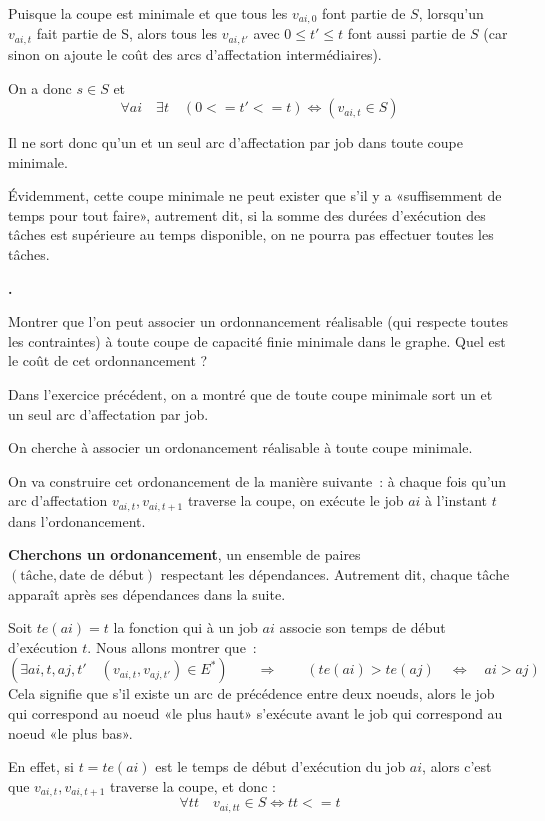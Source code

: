 \documentclass{article}
\newcounter{enoncecount}
\newenvironment{enonce}
{
\stepcounter{enoncecount}
\bf\small \arabic{enoncecount}.
\begin{bf}
}
{
\end{bf}
}
\begin{document}
Puisque la coupe est minimale et que tous les $v_{ai,0}$ font partie de $S$, lorsqu'un $v_{ai,t}$ fait partie de S, alors tous les
$v_{ai,t'}$ avec $0 \leq t' \leq t$ font aussi partie de $S$ (car sinon on ajoute le coût des arcs d'affectation intermédiaires).

On a donc $s \in S$ et
\begin{equation}
\forall ai \quad \exists t \quad (0 <= t' <= t) \Leftrightarrow (v_{ai,t} \in S)
\label{eq:tous-t-debut-ligne}
\end{equation}

Il ne sort donc qu'un et un seul arc d'affectation par job dans toute coupe minimale.

Évidemment, cette coupe minimale ne peut exister que s'il y a «suffisemment de temps pour tout faire», autrement dit, si la somme des durées
d'exécution des tâches est supérieure au temps disponible, on ne pourra pas effectuer toutes les tâches.

\begin{enonce}
Montrer que l'on peut associer un ordonnancement réalisable (qui respecte toutes les contraintes) à toute 
coupe de capacité finie minimale dans le graphe. Quel est le coût de cet ordonnancement ? 
\end{enonce}

Dans l'exercice précédent, on a montré que de toute coupe minimale sort un et un seul arc d'affectation par job.

On cherche à associer un ordonancement réalisable à toute coupe minimale.

On va construire cet ordonancement de la manière suivante~: à chaque
fois qu'un arc d'affectation $v_{ai,t}, v_{ai,t+1}$ traverse la coupe,
on exécute le job $ai$ à l'instant $t$ dans l'ordonancement. 

\textbf{Cherchons un ordonancement}, un ensemble de paires $(\text{tâche},\text{date de début})$ respectant les dépendances.
Autrement dit, chaque tâche apparaît après ses dépendances dans la suite.

Soit $te(ai) = t$ la fonction qui à un job $ai$ associe son temps de début d'exécution $t$.
Nous allons montrer que~:
$$(\exists ai,t,aj,t' \quad (v_{ai,t},v_{aj,t'}) \in E^*) \qquad \Rightarrow \qquad (te(ai) > te(aj) \quad \Leftrightarrow \quad ai > aj)$$
Cela signifie que s'il existe un arc de précédence entre deux noeuds, alors le job qui
correspond au noeud «le plus haut» s'exécute avant le job qui correspond au
noeud «le plus bas».

En effet, si $t = te(ai)$ est le temps de début d'exécution du job $ai$, alors c'est que $v_{ai,t}, v_{ai,t+1}$
traverse la coupe, et donc :
\begin{equation}
  \forall tt \quad v_{ai,tt} \in S \Leftrightarrow tt <= t
  \label{eq:tous-t-avant-exec}
\end{equation}
\end{document}
